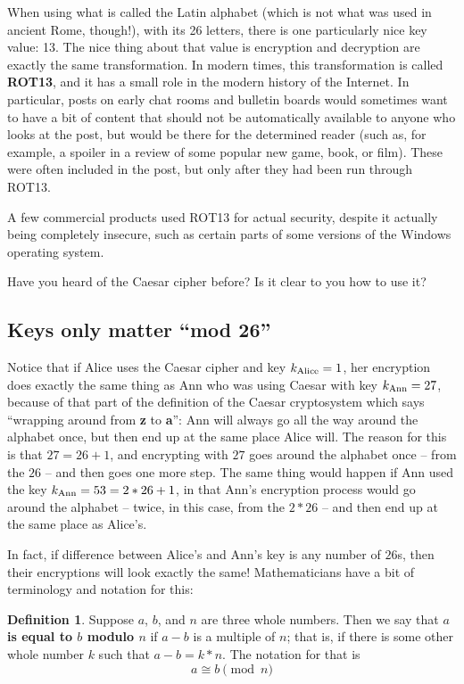 \documentclass[12pt,letterpaper]{amsbook}
\theoremstyle{definition}
\newtheorem{definition}[theorem]{Definition}
\theoremstyle{remark}
\numberwithin{figure}{section}
\numberwithin{exercise}{chapter}
\numberwithin{section}{chapter}
\numberwithin{equation}{section}
\numberwithin{table}{subsection}
\newcommand{\ix}[1]{{#1}\index{#1}}
\begin{document}
When using what is called the Latin alphabet (which is not what was used in
ancient Rome, though!), with its 26 letters, there is one particularly nice key
value: 13.  The nice thing about that value is encryption and decryption are
exactly the same transformation.  In modern times, this transformation is
called \textbf{\ix{ROT13}}, and it has a small role in the modern history
of the Internet.  In particular, posts on early chat rooms and bulletin boards
would sometimes want to have a bit of content that should not be automatically
available to anyone who looks at the post, but would be there for the determined
reader (such as, for example, a spoiler in a review of some popular new game,
book, or film).  These were often included in the post, but only after they
had been run through ROT13.

A few commercial products used ROT13 for actual security, despite it actually
being completely insecure, such as certain parts of some versions of the
Windows operating system.

\vskip5mm
\begin{AZtcb}[label=az:Caesar]{}{}
Have you heard of the Caesar cipher before?  Is it clear to you how to use it?
\end{AZtcb}

\vskip1cm
\subsection{Keys only matter ``mod 26''}\label{ssec:TCcaiv_komm26}
Notice that if Alice uses the Caesar cipher and key $k_{\rm Alice}=1$, her
encryption does exactly the same thing as Ann who was using Caesar with key
$k_{\rm Ann}=27$, because of that part of the definition of the Caesar
cryptosystem which says ``wrapping around from \textbf{z} to \textbf{a}'':
Ann will always go all the way around the alphabet once, but then end up at
the same place Alice will.  The reason for this is that $27=26+1$, and
encrypting with $27$ goes around the alphabet once -- from the $26$ -- and
then goes one more step.  The same thing would happen if Ann used the key
$k_{\rm Ann}=53=2*26+1$, in that Ann's encryption process would go around the
alphabet -- twice, in this case, from the $2*26$ -- and then end up at the
same place as Alice's.

In fact, if difference between Alice's and Ann's key is any number of $26$s,
then their encryptions will look exactly the same!  Mathematicians have a
bit of terminology and notation for this:
\begin{definition}\label{def:modulo}
  Suppose $a$, $b$, and $n$ are three whole numbers.  Then we say that
  \textbf{$a$ is equal to $b$ modulo $n$} if $a-b$ is a multiple of $n$; that
  is, if there is some other whole number $k$ such that $a-b=k*n$.  The
  notation for that is
  $$
  a\cong b\pmod{n}
  $$
\end{definition}
\end{document}
